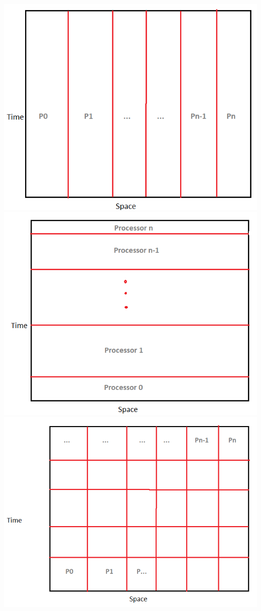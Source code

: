 \documentclass[12pt, a4paper]{report}
\begin{document}
\includegraphics[scale=0.3]{report/vertical.png} \includegraphics[scale=0.3]{report/horizontal.png}\\ \includegraphics[scale=0.4]{report/cube.png} \\
\end{document}

